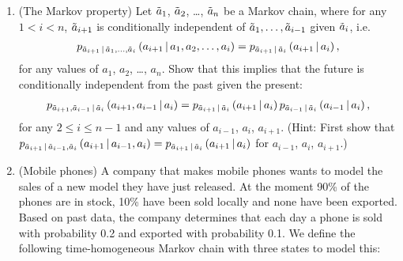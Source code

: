 \documentclass[12pt,twoside]{article}
\begin{document}
\begin{enumerate}
\item (The Markov property) Let $\tilde{  a }_1$, $\tilde{  a }_2$, \ldots, $\tilde{  a }_n$ be a Markov chain, where for any $1 < i < n$, $\tilde{  a }_{i+1}$ is conditionally independent of $\tilde{  a }_1 ,\ldots,\tilde{  a }_{i-1}$ given $\tilde{  a }_{i}$, i.e.
\begin{align}
\label{eq:markov_cond_pmf}
p_{ \tilde{  a }_{ i+1} \, | \, \tilde{  a }_1 ,\ldots,\tilde{  a }_{i}  }\left(  a_{i+1} \, | \, a_1, a_2, \ldots, a_i  \right) =  p_{ \tilde{  a }_{i+1}  \, | \, \tilde{  a }_i  }\left(  a_{ i+1} \, | \, a_{i}  \right),
\end{align}
for any values of $a_1$, $a_2$, \ldots, $a_n$. Show that this implies that the future is conditionally independent from the past given the present:
\begin{align}
p_{ \tilde{  a }_{ i+1},\tilde{  a }_{i-1} \, | \, \tilde{  a }_i }\left(  a_{i+1},a_{i-1} \, | \,  a_i  \right) = p_{ \tilde{  a }_{ i+1} \, | \, \tilde{  a }_i }\left(  a_{i+1} \, | \,  a_i  \right) p_{ \tilde{  a }_{i-1} \, | \, \tilde{  a }_i }\left(  a_{i-1} \, | \,  a_i  \right),
\end{align}
for any $2 \leq i \leq n-1$ and any values of $a_{i-1}$, $a_i$, $a_{i+1}$. (Hint: First show that $p_{ \tilde{  a }_{ i+1} \, | \, \tilde{  a }_{i-1} , \tilde{  a }_i}\left(  a_{i+1}\, | \, a_{i-1}, a_{i}   \right)  = p_{ \tilde{  a }_{ i+1} \, | \,  \tilde{  a }_i}\left(  a_{i+1}\, | \, a_{i}   \right) $ for $a_{i-1}$, $a_i$, $a_{i+1}$.)

\item (Mobile phones)
A company that makes mobile phones wants to model the sales of a new model they have just released. At the moment 90\% of the phones are in stock, 10\% have been sold locally and none have been exported. Based on past data, the company determines that each day a phone is sold with probability 0.2 and exported with probability 0.1. We define the following time-homogeneous Markov chain with three states to model this:

\begin{center}
\end{center} 


\end{enumerate}
\end{document}
